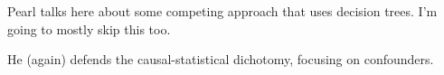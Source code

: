Pearl talks here about some competing approach that uses decision trees. I'm going to mostly skip this too.

He (again) defends the causal-statistical dichotomy, focusing on confounders.

